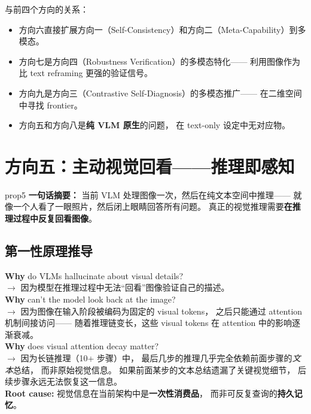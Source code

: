\documentclass[12pt,a4paper]{article}
\begin{document}
\noindent
与前四个方向的关系：
\begin{itemize}[leftmargin=2em]
  \item 方向六直接扩展方向一（Self-Consistency）和方向二（Meta-Capability）到多模态。
  \item 方向七是方向四（Robustness Verification）的多模态特化——
    利用图像作为比 text reframing 更强的验证信号。
  \item 方向九是方向三（Contrastive Self-Diagnosis）的多模态推广——
    在二维空间中寻找 frontier。
  \item 方向五和方向八是\textbf{纯 VLM 原生}的问题，
    在 text-only 设定中无对应物。
\end{itemize}


\newpage
\section{方向五：主动视觉回看——推理即感知}
\label{sec:prop5}

\begin{proposalbox}{prop5}
\textbf{一句话摘要：}
当前 VLM 处理图像一次，然后在纯文本空间中推理——
就像一个人看了一眼照片，然后闭上眼睛回答所有问题。
真正的视觉推理需要\textbf{在推理过程中反复回看图像}。
\end{proposalbox}

\subsection{第一性原理推导}

\begin{whybox}
\textbf{Why} do VLMs hallucinate about visual details?\\
$\rightarrow$ 因为模型在推理过程中无法``回看''图像验证自己的描述。\\[3pt]
\textbf{Why} can't the model look back at the image?\\
$\rightarrow$ 因为图像在输入阶段被编码为固定的 visual tokens，
之后只能通过 attention 机制间接访问——
随着推理链变长，这些 visual tokens 在 attention 中的影响逐渐衰减。\\[3pt]
\textbf{Why} does visual attention decay matter?\\
$\rightarrow$ 因为长链推理（10+ 步骤）中，
最后几步的推理几乎完全依赖前面步骤的\textit{文本}总结，
而非原始视觉信息。
如果前面某步的文本总结遗漏了关键视觉细节，
后续步骤永远无法恢复这一信息。\\[3pt]
\textbf{Root cause:}
视觉信息在当前架构中是\textbf{一次性消费品}，
而非可反复查询的\textbf{持久记忆}。
\end{whybox}
\end{document}
